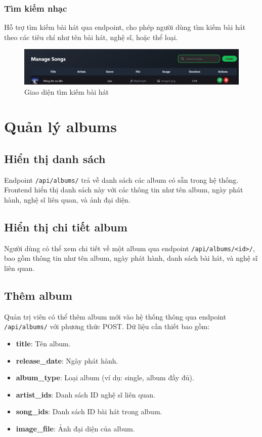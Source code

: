 \subsubsection{Tìm kiếm nhạc}
Hỗ trợ tìm kiếm bài hát qua endpoint, cho phép người dùng tìm kiếm bài hát theo các tiêu chí như tên bài hát, nghệ sĩ, hoặc thể loại.

\begin{figure}[H]
    \centering
    \includegraphics[width=1\textwidth]{latex/imgs/frontend-search-song.jpg}
    \caption{Giao diện tìm kiếm bài hát}
\end{figure}

\section{Quản lý albums}
\subsection{Hiển thị danh sách}
Endpoint \texttt{/api/albums/} trả về danh sách các album có sẵn trong hệ thống. Frontend hiển thị danh sách này với các thông tin như tên album, ngày phát hành, nghệ sĩ liên quan, và ảnh đại diện.

\subsection{Hiển thị chi tiết album}
Người dùng có thể xem chi tiết về một album qua endpoint \texttt{/api/albums/<id>/}, bao gồm thông tin như tên album, ngày phát hành, danh sách bài hát, và nghệ sĩ liên quan.

\subsection{Thêm album}
Quản trị viên có thể thêm album mới vào hệ thống thông qua endpoint \texttt{/api/albums/} với phương thức POST. Dữ liệu cần thiết bao gồm:
\begin{itemize}
    \item \textbf{title}: Tên album.
    \item \textbf{release\_date}: Ngày phát hành.
    \item \textbf{album\_type}: Loại album (ví dụ: single, album đầy đủ).
    \item \textbf{artist\_ids}: Danh sách ID nghệ sĩ liên quan.
    \item \textbf{song\_ids}: Danh sách ID bài hát trong album.
    \item \textbf{image\_file}: Ảnh đại diện của album.
\end{itemize}

